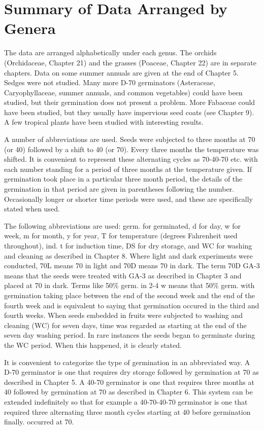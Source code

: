 \chapter{Summary of Data Arranged by Genera}

The data are arranged alphabetically under each genus. The orchids
(Orchidaceae, Chapter 21) and the grasses (Poaceae, Chapter 22) are in separate
chapters. Data on some summer annuals are given at the end of Chapter 5. Sedges
were not studied. Many more D-70 germinators (Asteraceae, Caryophyllaceae,
summer annuals, and common vegetables) could have been studied, but their
germination does not present a problem. More Fabaceae could have been studied,
but they usually have impervious seed coats (see Chapter 9). A few tropical plants
have been studied with interesting results.

A number of abbreviations are used. Seeds were subjected to three months at
70 (or 40) followed by a shift to 40 (or 70). Every three months the temperature was
shifted. It is convenient to represent these alternating cycles as 70-40-70 etc. with
each number standing for a period of three months at the temperature given. If
germination took place in a particular three month period, the details of the
germination in that period are given in parentheses following the number.
Occasionally longer or shorter time periods were used, and these are specifically
stated when used.

The following abbreviations are used: germ. for germinated, d for day, w for
week, m for month, y for year, T for temperature (degrees Fahrenheit used throughout),
ind. t for induction time, DS for dry storage, and WC for washing and cleaning as
described in Chapter 8. Where light and dark experiments were conducted, 70L
means 70 in light and 70D means 70 in dark. The term 70D GA-3 means that the
seeds were treated with GA-3 as described in Chapter 3 and placed at 70 in dark.
Terms like 50\% germ. in 2-4 w means that 50\% germ. with germination taking place
between the end of the second week and the end of the fourth week and is equivalent
to saying that germination occured in the third and fourth weeks.
When seeds embedded in fruits were subjected to washing and cleaning (WC)
for seven days, time was regarded as starting at the end of the seven day washing
period. In rare instances the seeds began to germinate during the WC period. When
this happened, it is clearly stated.

It is convenient to categorize the type of germination in an abbreviated way. A
D-70 germinator is one that requires dry storage followed by germination at 70 as
described in Chapter 5. A 40-70 germinator is one that requires three months at 40
followed by germination at 70 as described in Chapter 6. This system can be
extended indefinitely so that for example a 40-70-40-70 germinator is one that
required three alternating three month cycles starting at 40 before germination finally.
occurred at 70.


